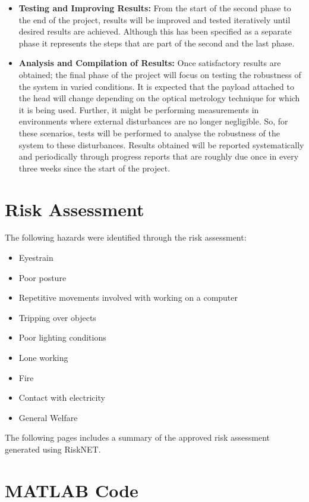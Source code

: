 \documentclass[a4paper,12pt]{report}
\begin{document}
\begin{appendices}
\begin{itemize}
		\item \textbf{Testing and Improving Results:} From the start of the second phase to the end of the project, results will be improved and tested iteratively until desired results are achieved. Although this has been specified as a separate phase it represents the steps that are part of the second and the last phase. 
		\item \textbf{Analysis and Compilation of Results:} Once satisfactory results are obtained; the final phase of the project will focus on testing the robustness of the system in varied conditions. It is expected that the payload attached to the head will change depending on the optical metrology technique for which it is being used. Further, it might be performing measurements in environments where external disturbances are no longer negligible. So, for these scenarios, tests will be performed to analyse the robustness of the system to these disturbances.
		Results obtained will be reported systematically and periodically through progress reports that are roughly due once in every three weeks since the start of the project.
	\end{itemize}
	
	
	\chapter{Risk Assessment}
	\label{appendix:b}
	The following hazards were identified through the risk assessment:
	\begin{itemize}
		\item Eyestrain
		\item Poor posture
		\item Repetitive movements involved with working on a computer
		\item Tripping over objects
		\item Poor lighting conditions
		\item Lone working
		\item Fire
		\item Contact with electricity
		\item General Welfare
	\end{itemize}
	The following pages includes a summary of the approved risk assessment generated using RiskNET.\\
	
	\chapter{MATLAB Code}
	
\end{appendices}



\end{document}
